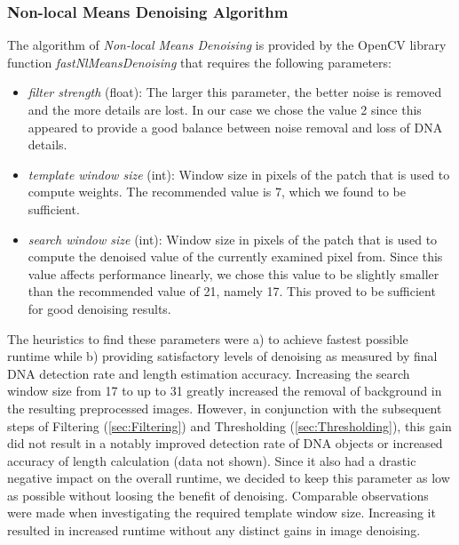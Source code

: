 \documentclass{article}
\begin{document}
\subsubsection{Non-local Means Denoising Algorithm}
The algorithm of \textit{Non-local Means Denoising} is provided by the OpenCV library function \textit{fastNlMeansDenoising} that requires the following parameters:
\begin{itemize}
	\item \textit{filter strength} (float): The larger this parameter, the better noise is removed and the more details are lost. In our case we chose the value 2 since this appeared to provide a good balance between noise removal and loss of DNA details.
	\item \textit{template window size} (int): Window size in pixels of the patch that is used to compute weights. The recommended value is 7, which we found to be sufficient.
	\item \textit{search window size} (int): Window size in pixels of the patch that is used to compute the denoised value of the currently examined pixel from. Since this value affects performance linearly, we chose this value to be slightly smaller than the recommended value of 21, namely 17. This proved to be sufficient for good denoising results.
\end{itemize}
The heuristics to find these parameters were a) to achieve fastest possible runtime while b) providing satisfactory levels of denoising as measured by final DNA detection rate and length estimation accuracy. Increasing the search window size from 17 to up to 31 greatly increased the removal of background in the resulting preprocessed images. However, in conjunction with the subsequent steps of Filtering (\ref{sec:Filtering}) and Thresholding (\ref{sec:Thresholding}), this gain did not result in a notably improved detection rate of DNA objects or increased accuracy of length calculation (data not shown). Since it also had a drastic negative impact on the overall runtime, we decided to keep this parameter as low as possible without loosing the benefit of denoising. Comparable observations were made when investigating the required template window size. Increasing it resulted in increased runtime without any distinct gains in image denoising. \\
\end{document}
